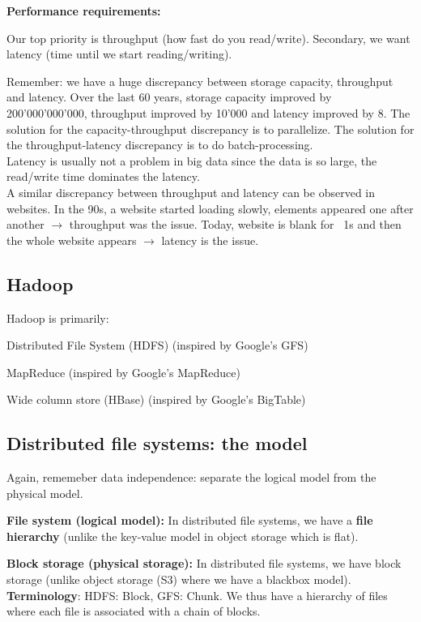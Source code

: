 \documentclass[11pt,oneside,a4paper]{article}
\begin{document}
\textbf{Performance requirements:}

Our top priority is throughput (how fast do you read/write). Secondary, we want latency (time until we start reading/writing).

Remember: we have a huge discrepancy between storage capacity, throughput and latency. Over the last 60 years, storage capacity improved by 200'000'000'000, throughput improved by 10'000 and latency improved by 8. The solution for the capacity-throughput discrepancy is to parallelize. The solution for the throughput-latency discrepancy is to do batch-processing.\\
Latency is usually not a problem in big data since the data is so large, the read/write time dominates the latency.\\
A similar discrepancy between throughput and latency can be observed in websites. In the 90s, a website started loading slowly, elements appeared one after another $\rightarrow$ throughput was the issue. Today, website is blank for ~1s and then the whole website appears $\rightarrow$ latency is the issue.

\subsection{Hadoop}

Hadoop is primarily:

\begin{compactitem}
	\item Distributed File System (HDFS) (inspired by Google's GFS)
	\item MapReduce (inspired by Google's MapReduce)
	\item Wide column store (HBase) (inspired by Google's BigTable)
\end{compactitem}

\subsection{Distributed file systems: the model}

Again, rememeber data independence: separate the logical model from the physical model.

\textbf{File system (logical model):} In distributed file systems, we have a \textbf{file hierarchy} (unlike the key-value model in object storage which is flat).

\textbf{Block storage (physical storage):} In distributed file systems, we have block storage (unlike object storage (S3) where we have a blackbox model).\\
\textbf{Terminology}: HDFS: Block, GFS: Chunk.
We thus have a hierarchy of files where each file is associated with a chain of blocks.\\
\end{document}
